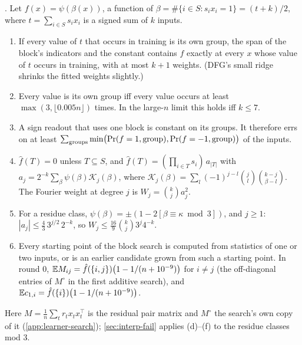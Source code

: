 \begin{proposition}\label{prop:blocks}
. Let $f(x)=\psi(\beta(x))$, a function of $\beta=\#\{i\in S:s_ix_i=1\}=(t+k)/2$, where $t=\sum_{i\in S}s_ix_i$ is a signed sum of $k$ inputs.
\begin{enumerate}[label=(\alph*)]
\item If every value of $t$ that occurs in training is its own group, the span of the block's indicators and the constant contains $f$ exactly at every $x$ whose value of $t$ occurs in training, with at most $k+1$ weights. (DFG's small ridge shrinks the fitted weights slightly.)
\item Every value is its own group iff every value occurs at least $\max(3,\lfloor0.005n\rfloor)$ times. In the large-$n$ limit this holds iff $k\le7$.
\item A sign readout that uses one block is constant on its groups. It therefore errs on at least $\sum_{\rm groups}\min\bigl(\Pr(f=1,\text{group}),\Pr(f=-1,\text{group})\bigr)$ of the inputs.
\item $\hat f(T)=0$ unless $T\subseteq S$, and $\hat f(T)=(\prod_{i\in T}s_i)\,a_{|T|}$ with $a_j=2^{-k}\sum_\beta\psi(\beta)\mathcal K_j(\beta)$, where $\mathcal K_j(\beta)=\sum_l(-1)^{j-l}\binom jl\binom{k-j}{\beta-l}$. The Fourier weight at degree $j$ is $W_j=\binom kja_j^2$.
\item For a residue class, $\psi(\beta)=\pm(1-2[\beta\equiv\kappa\bmod3])$, and $j\ge1$: $|a_j|\le\frac43\,3^{j/2}\,2^{-k}$, so $W_j\le\frac{16}9\binom kj3^j4^{-k}$.
\item Every starting point of the block search is computed from statistics of one or two inputs, or is an earlier candidate grown from such a starting point. In round 0, $\mathbb{E} M_{ij}=\hat f(\{i,j\})\bigl(1-1/(n+10^{-9})\bigr)$ for $i\ne j$ (the off-diagonal entries of $M^\circ$ in the first additive search), and $\mathbb{E} c_{1,i}=\hat f(\{i\})\bigl(1-1/(n+10^{-9})\bigr)$.
\end{enumerate}
\end{proposition}
Here $M=\frac1n\sum_tr_tx_tx_t^\top$ is the residual pair matrix and $M^\circ$ the search's own copy of it (\cref{app:learner-search}); \cref{sec:interp-fail} applies (d)--(f) to the residue classes mod 3.


